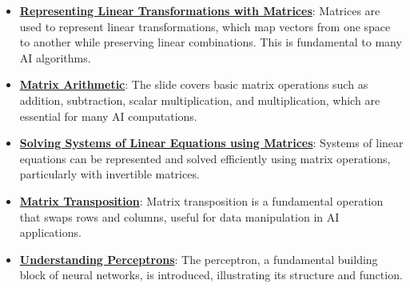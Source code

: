 \documentclass{article}%
\begin{document}
\begin{itemize}[leftmargin=*]%
\item \href{https://purdue.brightspace.com/d2l/common/assets/pdfjs-d2l-dist/1.0.14-legacy/web/viewer.html?file=\%2Fcontent\%2Fenforced\%2F1095467-wl.202510.CS.24300.001\%2F04L1-Linear Algebra Primer.pdf\%3Fou\%3D1095467\&lang=en-us\&container=d2l-fileviewer-rendered-pdf\&fullscreen=d2l-fileviewer-rendered-pdf-dialog\&height=667#page=5}{\textbf{Representing Linear Transformations with Matrices}}: Matrices are used to represent linear transformations, which map vectors from one space to another while preserving linear combinations. This is fundamental to many AI algorithms.%
\item \href{https://purdue.brightspace.com/d2l/common/assets/pdfjs-d2l-dist/1.0.14-legacy/web/viewer.html?file=\%2Fcontent\%2Fenforced\%2F1095467-wl.202510.CS.24300.001\%2F04L1-Linear Algebra Primer.pdf\%3Fou\%3D1095467\&lang=en-us\&container=d2l-fileviewer-rendered-pdf\&fullscreen=d2l-fileviewer-rendered-pdf-dialog\&height=667#page=9}{\textbf{Matrix Arithmetic}}: The slide covers basic matrix operations such as addition, subtraction, scalar multiplication, and multiplication, which are essential for many AI computations.%
\item \href{https://purdue.brightspace.com/d2l/common/assets/pdfjs-d2l-dist/1.0.14-legacy/web/viewer.html?file=\%2Fcontent\%2Fenforced\%2F1095467-wl.202510.CS.24300.001\%2F04L1-Linear Algebra Primer.pdf\%3Fou\%3D1095467\&lang=en-us\&container=d2l-fileviewer-rendered-pdf\&fullscreen=d2l-fileviewer-rendered-pdf-dialog\&height=667#page=11}{\textbf{Solving Systems of Linear Equations using Matrices}}: Systems of linear equations can be represented and solved efficiently using matrix operations, particularly with invertible matrices.%
\item \href{https://purdue.brightspace.com/d2l/common/assets/pdfjs-d2l-dist/1.0.14-legacy/web/viewer.html?file=\%2Fcontent\%2Fenforced\%2F1095467-wl.202510.CS.24300.001\%2F04L1-Linear Algebra Primer.pdf\%3Fou\%3D1095467\&lang=en-us\&container=d2l-fileviewer-rendered-pdf\&fullscreen=d2l-fileviewer-rendered-pdf-dialog\&height=667#page=16}{\textbf{Matrix Transposition}}: Matrix transposition is a fundamental operation that swaps rows and columns, useful for data manipulation in AI applications.%
\item \href{https://purdue.brightspace.com/d2l/common/assets/pdfjs-d2l-dist/1.0.14-legacy/web/viewer.html?file=\%2Fcontent\%2Fenforced\%2F1095467-wl.202510.CS.24300.001\%2F04L1-Linear Algebra Primer.pdf\%3Fou\%3D1095467\&lang=en-us\&container=d2l-fileviewer-rendered-pdf\&fullscreen=d2l-fileviewer-rendered-pdf-dialog\&height=667#page=17}{\textbf{Understanding Perceptrons}}: The perceptron, a fundamental building block of neural networks, is introduced, illustrating its structure and function.%

\end{itemize}
\end{document}
